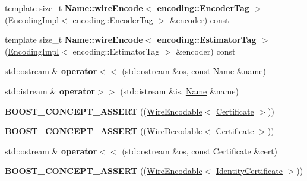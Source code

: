 \begin{DoxyCompactItemize}
\item 
template size\+\_\+t {\bfseries Name\+::wire\+Encode$<$ encoding\+::\+Encoder\+Tag $>$} (\hyperlink{classndn_1_1encoding_1_1EncodingImpl}{Encoding\+Impl}$<$ encoding\+::\+Encoder\+Tag $>$ \&encoder) const\hypertarget{namespacendn_a085245412e0a0b50c21b5395f57095d9}{}\label{namespacendn_a085245412e0a0b50c21b5395f57095d9}

\item 
template size\+\_\+t {\bfseries Name\+::wire\+Encode$<$ encoding\+::\+Estimator\+Tag $>$} (\hyperlink{classndn_1_1encoding_1_1EncodingImpl}{Encoding\+Impl}$<$ encoding\+::\+Estimator\+Tag $>$ \&encoder) const\hypertarget{namespacendn_a5b7ca4cc91ed0d3c040e65e6925c6fb7}{}\label{namespacendn_a5b7ca4cc91ed0d3c040e65e6925c6fb7}

\item 
std\+::ostream \& {\bfseries operator$<$$<$} (std\+::ostream \&os, const \hyperlink{classndn_1_1Name}{Name} \&name)\hypertarget{namespacendn_ae584b720c062d171e59a292a9a177975}{}\label{namespacendn_ae584b720c062d171e59a292a9a177975}

\item 
std\+::istream \& {\bfseries operator$>$$>$} (std\+::istream \&is, \hyperlink{classndn_1_1Name}{Name} \&name)\hypertarget{namespacendn_afd4a205438577d64006008c359af04f2}{}\label{namespacendn_afd4a205438577d64006008c359af04f2}

\item 
{\bfseries B\+O\+O\+S\+T\+\_\+\+C\+O\+N\+C\+E\+P\+T\+\_\+\+A\+S\+S\+E\+RT} ((\hyperlink{classndn_1_1WireEncodable}{Wire\+Encodable}$<$ \hyperlink{classndn_1_1Certificate}{Certificate} $>$))\hypertarget{namespacendn_ad4d1be16ea5b072648e63fe2da41be43}{}\label{namespacendn_ad4d1be16ea5b072648e63fe2da41be43}

\item 
{\bfseries B\+O\+O\+S\+T\+\_\+\+C\+O\+N\+C\+E\+P\+T\+\_\+\+A\+S\+S\+E\+RT} ((\hyperlink{classndn_1_1WireDecodable}{Wire\+Decodable}$<$ \hyperlink{classndn_1_1Certificate}{Certificate} $>$))\hypertarget{namespacendn_a446188df332977aa400e6ccd1db4ef8f}{}\label{namespacendn_a446188df332977aa400e6ccd1db4ef8f}

\item 
std\+::ostream \& {\bfseries operator$<$$<$} (std\+::ostream \&os, const \hyperlink{classndn_1_1Certificate}{Certificate} \&cert)\hypertarget{namespacendn_af9821879d8bae45acd31c71833282764}{}\label{namespacendn_af9821879d8bae45acd31c71833282764}

\item 
{\bfseries B\+O\+O\+S\+T\+\_\+\+C\+O\+N\+C\+E\+P\+T\+\_\+\+A\+S\+S\+E\+RT} ((\hyperlink{classndn_1_1WireEncodable}{Wire\+Encodable}$<$ \hyperlink{classndn_1_1IdentityCertificate}{Identity\+Certificate} $>$))\hypertarget{namespacendn_ad1ac779e05e8e289a214c63b87fdaee1}{}\label{namespacendn_ad1ac779e05e8e289a214c63b87fdaee1}


\end{DoxyCompactItemize}
